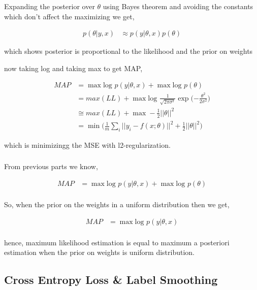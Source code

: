 \documentclass{article}
\begin{document}
Expanding the posterior over $\theta$ using Bayes theorem and avoiding the constants which don't affect the maximizing we get,

\begin{align*}
    p(\theta|y,x) &\approx p(y|\theta,x)p(\theta)
\end{align*}

which shows posterior is proportional to the likelihood and the prior on weights

now taking log and taking max to get MAP,

\begin{align*}
    MAP &= \max \text{log }p(y|\theta, x) + \max \text{log }p(\theta)\\
    &= max(LL) + \max \text{log }\frac{1}{\sqrt{2\pi\sigma^{2}}}\exp\Big({-\frac{\theta^{2}}{2\sigma^{2}}}\Big)\\
    &\cong max(LL) + \max -\frac{1}{2}||\theta||^2\\
    &= \min \Big(\frac{1}{m}\sum_{i}{||y_{i} - f(x;\theta)||^2} + \frac{1}{2}||\theta||^2 \Big)
\end{align*}

which is minimizingg the MSE with l2-regularization.

\subsubsection{}

From previous parts we know,

\begin{align*}
    MAP &= \max \text{log }p(y|\theta, x) + \max \text{log }p(\theta)\\
\end{align*}

So, when the prior on the weights in a uniform distribution then we get,

\begin{align*}
    MAP &= \max \text{log }p(y|\theta, x)\\
\end{align*}

hence, maximum likelihood estimation is equal to maximum a posteriori estimation when the prior on weights is uniform distribution.



\subsection{Cross Entropy Loss \& Label Smoothing}
\end{document}
